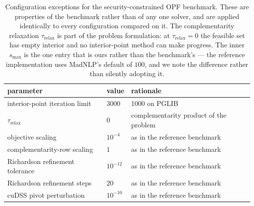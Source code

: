 \begin{table}[tbp]\centering\small
\caption{Configuration exceptions for the security-constrained OPF benchmark. These are
properties of the benchmark rather than of any one solver, and are applied identically to
every configuration compared on it. The complementarity relaxation $\tau_{\mathrm{relax}}$
is part of the problem formulation: at $\tau_{\mathrm{relax}}=0$ the feasible set has empty
interior and no interior-point method can make progress. The inner $s_{\max}$ is the one
entry that is ours rather than the benchmark's --- the reference implementation uses
MadNLP's default of $100$, and we note the difference rather than silently adopting it.}
\label{tab:scopf-config}
\begin{tabular}{lll}\toprule
parameter & value & rationale \\\midrule
interior-point iteration limit & $3000$ & 1000 on PGLIB \\
$\tau_{\mathrm{relax}}$ & $0$ & complementarity product of the problem \\
objective scaling & $10^{-4}$ & as in the reference benchmark \\
complementarity-row scaling & $1$ & as in the reference benchmark \\
Richardson refinement tolerance & $10^{-12}$ & as in the reference benchmark \\
Richardson refinement steps & $20$ & as in the reference benchmark \\
cuDSS pivot perturbation & $10^{-10}$ & as in the reference benchmark \\
\bottomrule\end{tabular}\end{table}
